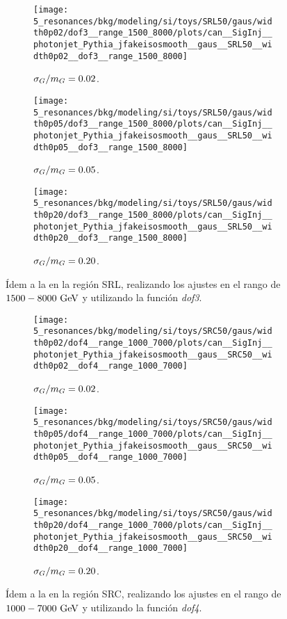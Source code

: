 \begin{figure}[ht!]
    \centering
    \begin{subfigure}[h]{0.32\linewidth}
        \centering
        \texttt{[image: 5\_resonances/bkg/modeling/si/toys/SRL50/gaus/width0p02/dof3\_\_range\_1500\_8000/plots/can\_\_SigInj\_\_photonjet\_Pythia\_jfakeisosmooth\_\_gaus\_\_SRL50\_\_width0p02\_\_dof3\_\_range\_1500\_8000]}
        \caption{\(\sigma_G/m_{G} = 0.02\).}
    \end{subfigure}
    \hfill
    \begin{subfigure}[h]{0.32\linewidth}
        \centering
        \texttt{[image: 5\_resonances/bkg/modeling/si/toys/SRL50/gaus/width0p05/dof3\_\_range\_1500\_8000/plots/can\_\_SigInj\_\_photonjet\_Pythia\_jfakeisosmooth\_\_gaus\_\_SRL50\_\_width0p05\_\_dof3\_\_range\_1500\_8000]}
        \caption{\(\sigma_G/m_{G} = 0.05\).}
    \end{subfigure}
    \hfill
    \begin{subfigure}[h]{0.32\linewidth}
        \centering
        \texttt{[image: 5\_resonances/bkg/modeling/si/toys/SRL50/gaus/width0p20/dof3\_\_range\_1500\_8000/plots/can\_\_SigInj\_\_photonjet\_Pythia\_jfakeisosmooth\_\_gaus\_\_SRL50\_\_width0p20\_\_dof3\_\_range\_1500\_8000]}
        \caption{\(\sigma_G/m_{G} = 0.20\).}
    \end{subfigure}
    \caption{\'Idem a la \Fig{\ref{fig:si_results:siginj_gaus_SR}} en la regi\'on SRL, realizando los ajustes en el rango de \(1500-8000~\text{GeV}\) y utilizando la funci\'on \textit{dof3}.}
    \label{fig:si_results:siginj_gaus_SRL}
\end{figure}

\begin{figure}[ht!]
    \centering
    \begin{subfigure}[h]{0.32\linewidth}
        \centering
        \texttt{[image: 5\_resonances/bkg/modeling/si/toys/SRC50/gaus/width0p02/dof4\_\_range\_1000\_7000/plots/can\_\_SigInj\_\_photonjet\_Pythia\_jfakeisosmooth\_\_gaus\_\_SRC50\_\_width0p02\_\_dof4\_\_range\_1000\_7000]}
        \caption{\(\sigma_G/m_{G} = 0.02\).}
    \end{subfigure}
    \hfill
    \begin{subfigure}[h]{0.32\linewidth}
        \centering
        \texttt{[image: 5\_resonances/bkg/modeling/si/toys/SRC50/gaus/width0p05/dof4\_\_range\_1000\_7000/plots/can\_\_SigInj\_\_photonjet\_Pythia\_jfakeisosmooth\_\_gaus\_\_SRC50\_\_width0p05\_\_dof4\_\_range\_1000\_7000]}
        \caption{\(\sigma_G/m_{G} = 0.05\).}
    \end{subfigure}
    \hfill
    \begin{subfigure}[h]{0.32\linewidth}
        \centering
        \texttt{[image: 5\_resonances/bkg/modeling/si/toys/SRC50/gaus/width0p20/dof4\_\_range\_1000\_7000/plots/can\_\_SigInj\_\_photonjet\_Pythia\_jfakeisosmooth\_\_gaus\_\_SRC50\_\_width0p20\_\_dof4\_\_range\_1000\_7000]}
        \caption{\(\sigma_G/m_{G} = 0.20\).}
    \end{subfigure}
    \caption{\'Idem a la \Fig{\ref{fig:si_results:siginj_gaus_SR}} en la regi\'on SRC, realizando los ajustes en el rango de \(1000-7000~\text{GeV}\) y utilizando la funci\'on \textit{dof4}.}
    \label{fig:si_results:siginj_gaus_SRC}
\end{figure}

